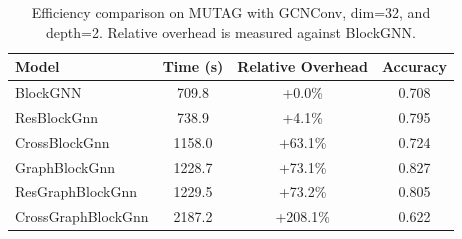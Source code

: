 \begin{table}[t]
\centering
\caption{Efficiency comparison on MUTAG with GCNConv, dim=32, and depth=2. Relative overhead is measured against BlockGNN.}
\label{tab:efficiency}
\begin{tabular}{lccc}
\toprule
Model & Time (s) & Relative Overhead & Accuracy \\
\midrule
BlockGNN & 709.8 & +0.0\% & 0.708 \\
ResBlockGnn & 738.9 & +4.1\% & 0.795 \\
CrossBlockGnn & 1158.0 & +63.1\% & 0.724 \\
GraphBlockGnn & 1228.7 & +73.1\% & 0.827 \\
ResGraphBlockGnn & 1229.5 & +73.2\% & 0.805 \\
CrossGraphBlockGnn & 2187.2 & +208.1\% & 0.622 \\
\bottomrule
\end{tabular}
\end{table}